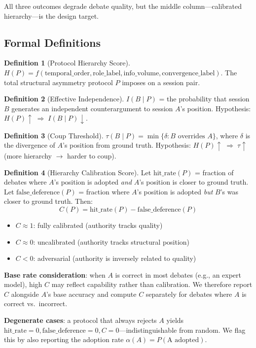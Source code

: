 \documentclass[11pt]{article}
\theoremstyle{definition}
\newtheorem{definition}{Definition}
\begin{document}
All three outcomes degrade debate quality, but the middle column---calibrated hierarchy---is the design target.

\subsection{Formal Definitions}

\begin{definition}[Protocol Hierarchy Score]
$H(P) = f(\text{temporal\_order}, \text{role\_label}, \text{info\_volume}, \text{convergence\_label})$. The total structural asymmetry protocol $P$ imposes on a session pair.
\end{definition}

\begin{definition}[Effective Independence]
$I(B \mid P)$ = the probability that session $B$ generates an independent counterargument to session $A$'s position. Hypothesis: $H(P) \uparrow \;\Rightarrow\; I(B \mid P) \downarrow$.
\end{definition}

\begin{definition}[Coup Threshold]
$\tau(B \mid P) = \min\{\delta : B \text{ overrides } A\}$, where $\delta$ is the divergence of $A$'s position from ground truth. Hypothesis: $H(P) \uparrow \;\Rightarrow\; \tau \uparrow$ (more hierarchy $\to$ harder to coup).
\end{definition}

\begin{definition}[Hierarchy Calibration Score]
\label{def:calibration}
Let $\text{hit\_rate}(P)$ = fraction of debates where $A$'s position is adopted \emph{and} $A$'s position is closer to ground truth. Let $\text{false\_deference}(P)$ = fraction where $A$'s position is adopted \emph{but} $B$'s was closer to ground truth. Then:
\[
C(P) = \text{hit\_rate}(P) - \text{false\_deference}(P)
\]
\begin{itemize}[nosep]
    \item $C \approx 1$: fully calibrated (authority tracks quality)
    \item $C \approx 0$: uncalibrated (authority tracks structural position)
    \item $C < 0$: adversarial (authority is inversely related to quality)
\end{itemize}

\textbf{Base rate consideration}: when $A$ is correct in most debates (e.g., an expert model), high $C$ may reflect capability rather than calibration. We therefore report $C$ alongside $A$'s base accuracy and compute $C$ separately for debates where $A$ is correct vs.\ incorrect.

\textbf{Degenerate cases}: a protocol that always rejects $A$ yields $\text{hit\_rate} = 0, \text{false\_deference} = 0, C = 0$---indistinguishable from random. We flag this by also reporting the adoption rate $\alpha(A) = P(\text{A adopted})$.
\end{definition}
\end{document}
